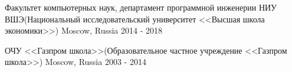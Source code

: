 


\begin{cventries}
\cventry
{Факультет компьютерных наук, департамент программной инженерии} %
{НИУ ВШЭ(Национальный исследовательский университет <<Высшая школа экономики>>)} %
{Moscow, Russia} %
{2014 - 2018} %
{ %
}


\cventry
{}
{ОЧУ <<Газпром школа>>(Образовательное частное учреждение <<Газпром школа>>)} %
{Moscow, Russia} %
{2003 - 2014} %
{ %
}


\end{cventries}
